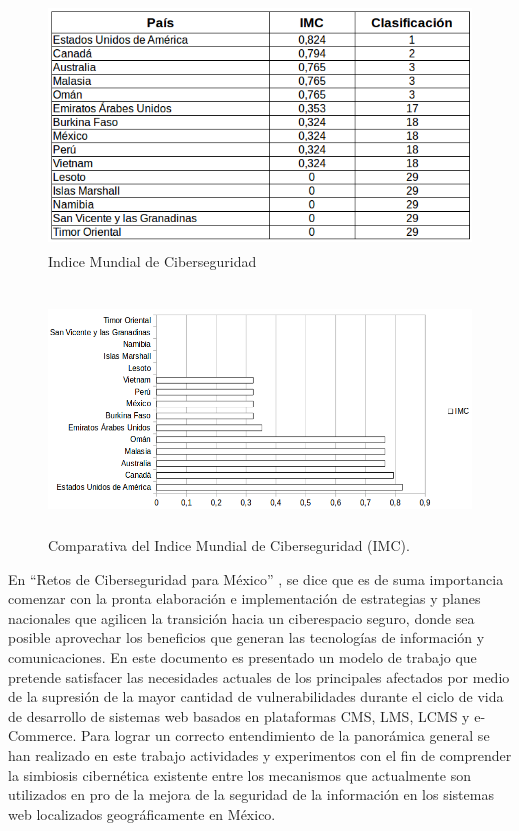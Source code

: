 \documentclass[runningheads,a4paper]{llncs}
\begin{document}
\begin{figure}
\centering
\includegraphics[height=6.5cm, width=12.0cm]{imc}
\caption{Indice Mundial de Ciberseguridad}
\label{fig:example}
\end{figure}


\begin{figure}
\centering
\includegraphics[height=6.5cm, width=12.0cm]{imc_graph}
\caption{Comparativa del Indice Mundial de Ciberseguridad (IMC).}
\label{fig:example}
\end{figure}

En ``Retos de Ciberseguridad para México'' \cite{RCM_1} , se dice que es de suma importancia comenzar con la pronta elaboración e implementación de estrategias y planes nacionales que agilicen la transición hacia un ciberespacio seguro, donde sea posible aprovechar los beneficios que generan las tecnologías de información y comunicaciones. En este documento es presentado un modelo de trabajo que pretende satisfacer las necesidades actuales de los principales afectados por medio de la supresión de la mayor cantidad de vulnerabilidades durante el ciclo de vida de desarrollo de sistemas web basados en plataformas \gls{CMS}, \gls{LMS}, \gls{LCMS} y e-Commerce. Para lograr un correcto entendimiento de la panorámica general se han realizado en este trabajo actividades y experimentos con el fin de comprender la simbiosis cibernética existente entre los mecanismos que actualmente son utilizados en pro de la mejora de la seguridad de la información en los sistemas web localizados geográficamente en México.\\
\end{document}
